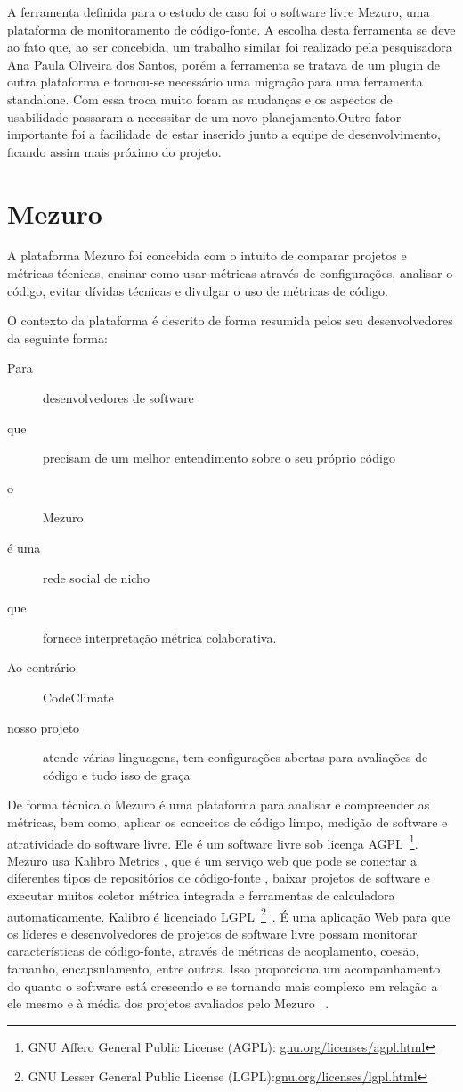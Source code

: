 A ferramenta definida para o estudo de caso foi o software livre Mezuro, uma plataforma de monitoramento de código-fonte. A escolha desta ferramenta se deve ao fato que, ao ser concebida, um trabalho similar foi realizado pela pesquisadora Ana Paula Oliveira dos Santos, porém a ferramenta se tratava de um plugin de outra plataforma e tornou-se necessário uma migração para uma ferramenta standalone. Com essa troca muito foram as mudanças e os aspectos de usabilidade passaram a necessitar de um novo planejamento.Outro fator importante foi a facilidade de estar inserido junto a equipe de desenvolvimento, ficando assim mais próximo do projeto.

\section{Mezuro}
\label{mezuro}

A plataforma Mezuro foi concebida com o intuito de comparar projetos e métricas técnicas,
ensinar como usar métricas através de configurações, analisar o código, evitar dívidas técnicas e divulgar o uso de métricas de código.

O contexto da plataforma é descrito de forma resumida pelos seu desenvolvedores da seguinte forma:
\begin{description}
\item[Para] desenvolvedores de software
\item[que] precisam de um melhor entendimento sobre o seu próprio código
\item[o] Mezuro
\item[é uma] rede social de nicho
\item[que] fornece interpretação métrica colaborativa.
\item[Ao contrário] CodeClimate
\item[nosso projeto] atende várias linguagens, tem configurações abertas para avaliações de código e tudo isso de graça
\end{description}

De forma técnica o Mezuro é uma plataforma para analisar e compreender as métricas, bem como, aplicar os conceitos de código limpo, medição de software e atratividade do software livre. Ele é um software livre sob licença AGPL~\footnote{GNU Affero General Public License (AGPL): \url{gnu.org/licenses/agpl.html}}. Mezuro usa Kalibro Metrics , que é um serviço web que pode se conectar a diferentes tipos de repositórios de código-fonte , baixar projetos de software e executar muitos coletor métrica integrada e ferramentas de calculadora automaticamente. Kalibro é licenciado LGPL~\footnote{GNU Lesser General Public License (LGPL):\url{gnu.org/licenses/lgpl.html}}~\cite{mezuro2012}.
É uma aplicação Web para que os líderes e desenvolvedores de projetos de software livre possam monitorar características de código-fonte, através de métricas de acoplamento, coesão, tamanho, encapsulamento, entre outras. Isso proporciona um acompanhamento do quanto o software está crescendo e se tornando mais complexo em relação a ele mesmo e à média dos projetos avaliados pelo Mezuro~\cite{santos2012}
.

